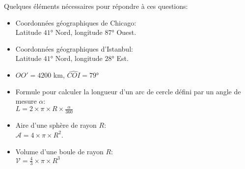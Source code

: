 \begin{changemargin}{-5mm}{-10mm}
\begin{remarque}
    Quelques éléments nécessaires pour répondre à ces questions:
    \begin{itemize}
        \item  Coordonnées géographiques de Chicago:\\
        Latitude $\ang{41}$ Nord, longitude $\ang{87}$ Ouest.
        \item  Coordonnées géographiques d'Istanbul:\\
        Latitude $\ang{41}$ Nord, longitude $\ang{28}$ Est.
        \item  $OO'=4200$ km, $\widehat{COI}=\ang{79}$
        \item  Formule pour calculer la longueur d'un arc de cercle défini par un angle de mesure $\alpha$:\\ $L=2\times\pi\times R\times\frac{\alpha}{360}$
        \item  Aire d'une sphère de rayon $R$:\\
        $\mathcal{A}=4\times\pi\times R^2$.
        \item  Volume d'une boule de rayon $R$:\\
        $\mathcal{V}=\frac{4}{3}\times\pi\times R^3$
    \end{itemize}
\end{remarque}
\end{changemargin}
